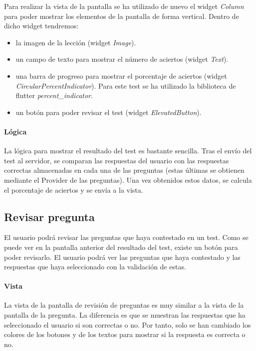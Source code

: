Para realizar la vista de la pantalla se ha utilizado de nuevo el widget \textit{Column} para poder mostrar los elementos de la pantalla de forma vertical. 
Dentro de dicho widget tendremos:
\begin{itemize}
  \item la imagen de la lección (widget \textit{Image}).
  \item un campo de texto para mostrar el número de aciertos (widget \textit{Text}).
  \item una barra de progreso para mostrar el porcentaje de aciertos (widget \textit{CircularPercentIndicator}). 
  Para este test se ha utilizado la biblioteca de flutter \textit{percent\_indicator}.
  \item un botón para poder revisar el test (widget \textit{ElevatedButton}).
\end{itemize}

\paragraph*{Lógica}
\label{sec:logica}
La lógica para mostrar el resultado del test es bastante sencilla.
Tras el envío del test al servidor, se comparan las respuestas del usuario con las respuestas correctas almacenadas en cada una de las preguntas 
(estas últimas se obtienen mediante el Provider de las preguntas). 
Una vez obtenidos estos datos, se calcula el porcentaje de aciertos y se envía a la vista.



\subsection{Revisar pregunta}
\label{sec:pregunta}
El usuario podrá revisar las preguntas que haya contestado en un test. Como se puede ver en la pantalla anterior del resultado del test, 
existe un botón para poder revisarlo. El usuario podrá ver las preguntas que haya contestado y las respuestas que haya seleccionado con la validación de estas.

\paragraph*{Vista}
\label{sec:vista}
La vista de la pantalla de revisión de preguntas es muy similar a la vista de la pantalla de la pregunta. 
La diferencia es que se muestran las respuestas que ha seleccionado el usuario si son correctas o no.
Por tanto, solo se han cambiado los colores de los botones y de los textos para mostrar si la respuesta es correcta o no.

